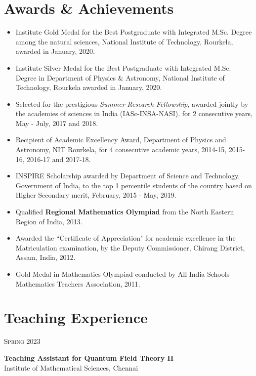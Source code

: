 \documentclass[11pt, letterpaper]{article}
\newcommand{\entry}[4]{
	\ifthenelse{\isempty{#3}}
	{\slimentry{#1}{#2}}{
		\begin{minipage}[t]{.25\linewidth}
			\hfill \textsc{#1}
		\end{minipage}
		\hfill \vline \hfill
		\begin{minipage}[t]{.7\linewidth}
			{\bf #2} \\ \textsf{#3} \\ \footnotesize{#4}
		\end{minipage}\\
		\vspace{.2cm}
}}
\newcommand{\slimentry}[2]{
	\begin{minipage}[t]{.25\linewidth}
		\hfill \textsc{#1}
	\end{minipage}
	\hfill \vline \hfill
	\begin{minipage}[t]{.7\linewidth}
		#2
	\end{minipage}\\
	\vspace{.25cm}
}%
\newcommand{\imsc}{Institute of Mathematical Sciences, Chennai}
\begin{document}
	\section{Awards \& Achievements}
	\begin{itemize}
	\renewcommand{\labelitemi}{\color{blue}$\scriptstyle{\lozenge}$}
		\item Institute Gold Medal for the Best Postgraduate with Integrated M.Sc. Degree among the natural sciences, National Institute of Technology, Rourkela, awarded in January, 2020.

		\item Institute Silver Medal for the Best Postgraduate with Integrated M.Sc. Degree in Department of Physics \& Astronomy, National Institute of Technology, Rourkela awarded in January, 2020.

		\item Selected for the prestigious \emph{Summer Research Fellowship}, awarded jointly by the academies of sciences in India (IASc-INSA-NASI), for 2 consecutive years, May - July, 2017 and 2018.

		\item Recipient of Academic Excellency Award, Department of Physics and Astronomy, NIT Rourkela, for 4 consecutive academic years, 2014-15, 2015-16, 2016-17 and 2017-18.

		\item INSPIRE Scholarship awarded by Department of Science and Technology, Government of India, to the top 1 percentile students of the country based on Higher Secondary merit, February, 2015 - May, 2019.

		\item Qualified \textbf{Regional Mathematics Olympiad} from the North Eastern Region of India, 2013.

		\item Awarded the ``Certificate of Appreciation" for academic excellence in the Matriculation examination, by the Deputy Commissioner, Chirang District, Assam, India, 2012.

		\item Gold Medal in Mathematics Olympiad conducted by All India Schools Mathematics Teachers Association, 2011.
	\end{itemize}

	\section{Teaching Experience}
	\slimentry{Spring 2023}{\textbf{Teaching Assistant for Quantum Field Theory II} \\ \imsc}
	
\end{document}
